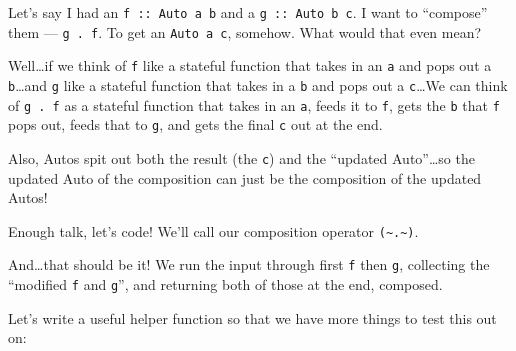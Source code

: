 \documentclass[]{article}
\newenvironment{Shaded}{}{}
\newcommand{\KeywordTok}[1]{\textcolor[rgb]{0.00,0.44,0.13}{\textbf{{#1}}}}
\newcommand{\DataTypeTok}[1]{\textcolor[rgb]{0.56,0.13,0.00}{{#1}}}
\newcommand{\CommentTok}[1]{\textcolor[rgb]{0.38,0.63,0.69}{\textit{{#1}}}}
\newcommand{\OtherTok}[1]{\textcolor[rgb]{0.00,0.44,0.13}{{#1}}}
\newcommand{\FunctionTok}[1]{\textcolor[rgb]{0.02,0.16,0.49}{{#1}}}
\newcommand{\NormalTok}[1]{{#1}}
\begin{document}
Let's say I had an \texttt{f\ ::\ Auto\ a\ b} and a
\texttt{g\ ::\ Auto\ b\ c}. I want to ``compose'' them ---
\texttt{g\ .\ f}. To get an \texttt{Auto\ a\ c}, somehow. What would
that even mean?

Well\ldots{}if we think of \texttt{f} like a stateful function that
takes in an \texttt{a} and pops out a \texttt{b}\ldots{}and \texttt{g}
like a stateful function that takes in a \texttt{b} and pops out a
\texttt{c}\ldots{}We can think of \texttt{g\ .\ f} as a stateful
function that takes in an \texttt{a}, feeds it to \texttt{f}, gets the
\texttt{b} that \texttt{f} pops out, feeds that to \texttt{g}, and gets
the final \texttt{c} out at the end.

Also, Autos spit out both the result (the \texttt{c}) and the ``updated
Auto''\ldots{}so the updated Auto of the composition can just be the
composition of the updated Autos!

Enough talk, let's code! We'll call our composition operator
\texttt{(\textasciitilde{}.\textasciitilde{})}.

\begin{Shaded}
\end{Shaded}

And\ldots{}that should be it! We run the input through first \texttt{f}
then \texttt{g}, collecting the ``modified \texttt{f} and \texttt{g}'',
and returning both of those at the end, composed.

Let's write a useful helper function so that we have more things to test
this out on:

\begin{Shaded}
\end{Shaded}
\end{document}
